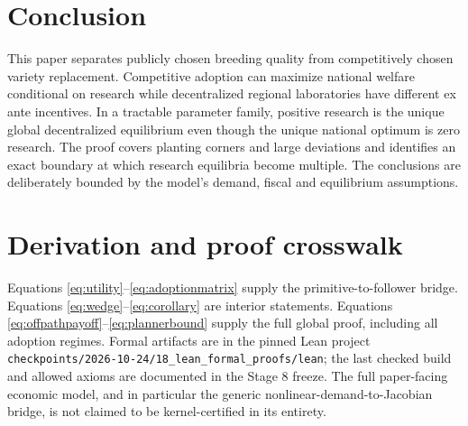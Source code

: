 \documentclass[11pt]{article}
\begin{document}
\section{Conclusion}
This paper separates publicly chosen breeding quality from competitively chosen variety replacement. Competitive adoption can maximize national welfare conditional on research while decentralized regional laboratories have different ex ante incentives. In a tractable parameter family, positive research is the unique global decentralized equilibrium even though the unique national optimum is zero research. The proof covers planting corners and large deviations and identifies an exact boundary at which research equilibria become multiple. The conclusions are deliberately bounded by the model's demand, fiscal and equilibrium assumptions.

\appendix
\section{Derivation and proof crosswalk}
Equations \eqref{eq:utility}--\eqref{eq:adoptionmatrix} supply the primitive-to-follower bridge. Equations \eqref{eq:wedge}--\eqref{eq:corollary} are interior statements. Equations \eqref{eq:offpathpayoff}--\eqref{eq:plannerbound} supply the full global proof, including all adoption regimes. Formal artifacts are in the pinned Lean project \texttt{checkpoints/2026-10-24/18\_lean\_formal\_proofs/lean}; the last checked build and allowed axioms are documented in the Stage 8 freeze. The full paper-facing economic model, and in particular the generic nonlinear-demand-to-Jacobian bridge, is not claimed to be kernel-certified in its entirety.
\end{document}
